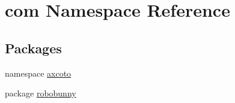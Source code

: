 \hypertarget{namespacecom}{\section{com \-Namespace \-Reference}
\label{namespacecom}
}
\subsection*{\-Packages}
\begin{DoxyCompactItemize}
\item 
namespace \hyperlink{namespacecom_1_1axcoto}{axcoto}
\item 
package \hyperlink{namespacecom_1_1robobunny}{robobunny}
\end{DoxyCompactItemize}
